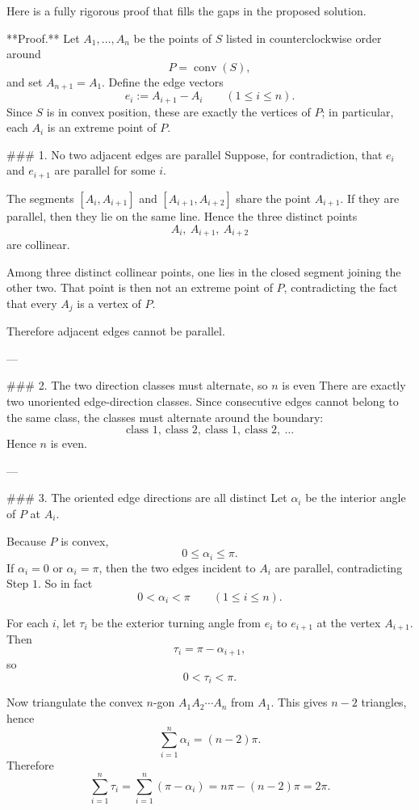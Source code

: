 Here is a fully rigorous proof that fills the gaps in the proposed solution.

**Proof.**  
Let \(A_1,\dots,A_n\) be the points of \(S\) listed in counterclockwise order around
\[
P=\operatorname{conv}(S),
\]
and set \(A_{n+1}=A_1\). Define the edge vectors
\[
e_i:=A_{i+1}-A_i \qquad (1\le i\le n).
\]
Since \(S\) is in convex position, these are exactly the vertices of \(P\); in particular, each \(A_i\) is an extreme point of \(P\).

### 1. No two adjacent edges are parallel
Suppose, for contradiction, that \(e_i\) and \(e_{i+1}\) are parallel for some \(i\).

The segments \([A_i,A_{i+1}]\) and \([A_{i+1},A_{i+2}]\) share the point \(A_{i+1}\). If they are parallel, then they lie on the same line. Hence the three distinct points
\[
A_i,\ A_{i+1},\ A_{i+2}
\]
are collinear.

Among three distinct collinear points, one lies in the closed segment joining the other two. That point is then not an extreme point of \(P\), contradicting the fact that every \(A_j\) is a vertex of \(P\).

Therefore adjacent edges cannot be parallel.

---

### 2. The two direction classes must alternate, so \(n\) is even
There are exactly two unoriented edge-direction classes. Since consecutive edges cannot belong to the same class, the classes must alternate around the boundary:
\[
\text{class }1,\ \text{class }2,\ \text{class }1,\ \text{class }2,\ \dots
\]
Hence \(n\) is even.

---

### 3. The oriented edge directions are all distinct
Let \(\alpha_i\) be the interior angle of \(P\) at \(A_i\).

Because \(P\) is convex,
\[
0\le \alpha_i \le \pi.
\]
If \(\alpha_i=0\) or \(\alpha_i=\pi\), then the two edges incident to \(A_i\) are parallel, contradicting Step \(1\). So in fact
\[
0<\alpha_i<\pi \qquad (1\le i\le n).
\]

For each \(i\), let \(\tau_i\) be the exterior turning angle from \(e_i\) to \(e_{i+1}\) at the vertex \(A_{i+1}\). Then
\[
\tau_i=\pi-\alpha_{i+1},
\]
so
\[
0<\tau_i<\pi.
\]

Now triangulate the convex \(n\)-gon \(A_1A_2\cdots A_n\) from \(A_1\). This gives \(n-2\) triangles, hence
\[
\sum_{i=1}^n \alpha_i=(n-2)\pi.
\]
Therefore
\[
\sum_{i=1}^n \tau_i
=
\sum_{i=1}^n (\pi-\alpha_i)
=
n\pi-(n-2)\pi
=
2\pi.
\]

